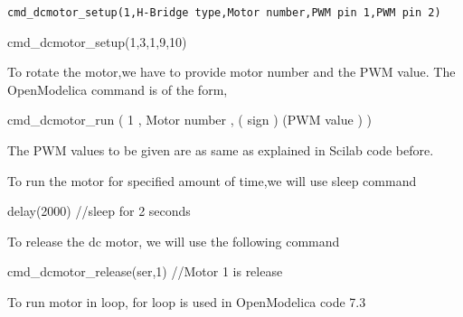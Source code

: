\begin{lstlisting}[style=nonumbers]
  cmd_dcmotor_setup(1,H-Bridge type,Motor number,PWM pin 1,PWM pin 2)
\end{lstlisting}
cmd\_dcmotor\_setup(1,3,1,9,10)

To rotate the motor,we have to provide motor number
and the PWM value. The OpenModelica command is of the form,

cmd\_dcmotor\_run ( 1 , Motor number , ( sign ) (PWM value ) )

The PWM values to be given are as same as explained in Scilab code before.

To run the motor for specified amount of time,we will use sleep command

delay(2000) //sleep for 2 seconds

To release the dc motor, we will use the following command

cmd\_dcmotor\_release(ser,1) //Motor 1 is release

To run motor in loop, for loop is used in OpenModelica code 7.3





